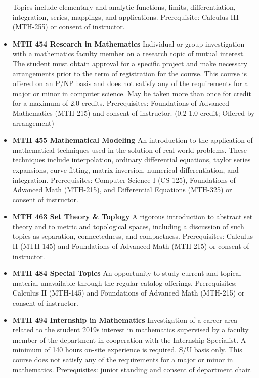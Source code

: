 \documentclass[
  letterpaper,
]{scrbook}
\begin{document}
\begin{itemize}
  Topics include elementary and analytic functions, limits,
  differentiation, integration, series, mappings, and applications.
  Prerequisite: Calculus III (MTH-255) or consent of instructor.
\item
  \textbf{MTH 454 Research in Mathematics} Individual or group
  investigation with a mathematics faculty member on a research topic of
  mutual interest. The student must obtain approval for a specific
  project and make necessary arrangements prior to the term of
  registration for the course. This course is offered on an P/NP basis
  and does not satisfy any of the requirements for a major or minor in
  computer science. May be taken more than once for credit for a maximum
  of 2.0 credits. Prerequisites: Foundations of Advanced Mathematics
  (MTH-215) and consent of instructor. (0.2-1.0 credit; Offered by
  arrangement)
\item
  \textbf{MTH 455 Mathematical Modeling} An introduction to the
  application of mathematical techniques used in the solution of real
  world problems. These techniques include interpolation, ordinary
  differential equations, taylor series expansions, curve fitting,
  matrix inversion, numerical differentiation, and integration.
  Prerequisites: Computer Science I (CS-125), Foundations of Advanced
  Math (MTH-215), and Differential Equations (MTH-325) or consent of
  instructor.
\item
  \textbf{MTH 463 Set Theory \& Toplogy} A rigorous introduction to
  abstract set theory and to metric and topological spaces, including a
  discussion of such topics as separation, connectedness, and
  compactness. Prerequisites: Calculus II (MTH-145) and Foundations of
  Advanced Math (MTH-215) or consent of instructor.
\item
  \textbf{MTH 484 Special Topics} An opportunity to study current and
  topical material unavailable through the regular catalog offerings.
  Prerequisites: Calculus II (MTH-145) and Foundations of Advanced Math
  (MTH-215) or consent of instructor.
\item
  \textbf{MTH 494 Internship in Mathematics} Investigation of a career
  area related to the student 2019s interest in mathematics supervised
  by a faculty member of the department in cooperation with the
  Internship Specialist. A minimum of 140 hours on-site experience is
  required. S/U basis only. This course does not satisfy any of the
  requirements for a major or minor in mathematics. Prerequisites:
  junior standing and consent of department chair.
\end{itemize}
\end{document}
